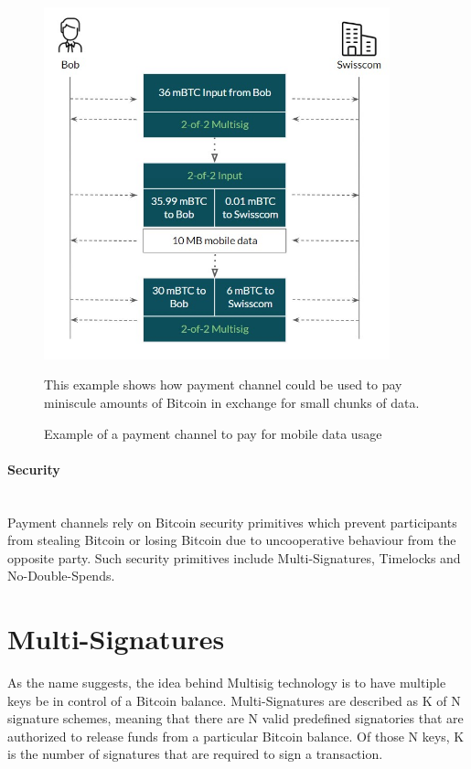 \documentclass[a4paper, 12pt]{report}
\begin{document}
\begin{figure}[H]
	\centering
	\includegraphics[width=10cm]{05_Onedirectional_Channel}
	\caption{Example of a payment channel to pay for mobile data usage}
	\medskip
	\small This example shows how payment channel could be used to pay miniscule amounts of Bitcoin in exchange for small chunks of data.
	\label{fig:05_Onedirectional_Channel}
\end{figure}

\paragraph{Security} \hspace{0pt} \\
Payment channels rely on Bitcoin security primitives which prevent participants from stealing Bitcoin or losing Bitcoin due to uncooperative behaviour from the opposite party. Such security primitives include Multi-Signatures, Timelocks and No-Double-Spends.

\section{Multi-Signatures}
\par As the name suggests, the idea behind Multisig technology is to have multiple keys be in control of a Bitcoin balance. Multi-Signatures are described as K of N signature schemes, meaning that there are N valid predefined signatories that are authorized to release funds from a particular Bitcoin balance. Of those N keys, K is the number of signatures that are required to sign a transaction.
\end{document}
